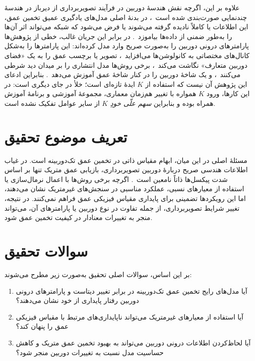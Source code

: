 علاوه بر این، اگرچه نقش هندسهٔ دوربین در فرآیند تصویربرداری از دیرباز در هندسهٔ
چندنمایی صورت‌بندی شده است~\cite{HartleyZisserman2004}، در بدنهٔ اصلی مدل‌های
یادگیری عمیق تخمین عمق، این اطلاعات یا کاملاً نادیده گرفته می‌شوند یا فرض می‌شود
که شبکه می‌تواند اثر آن‌ها را به‌طور ضمنی از داده‌ها بیاموزد~\cite{Eigen2014Depth,Godard2019Digging,Ranftl2021DPT}.
در برابر این جریان غالب، خطی از پژوهش‌ها پارامترهای درونی دوربین را به‌صورت صریح
وارد مدل کرده‌اند:  این پارامترها را به‌شکل کانال‌های مختصاتی به
کانولوشن‌ها می‌افزاید~\cite{Facil2019CAMConvs}،  تصویر یا برچسب عمق
را به یک «فضای دوربین متعارف» نگاشت می‌کند~\cite{Yin2023Metric3D}، برخی روش‌ها مدل
انتشاری را بر میدان دید شرطی می‌کنند~\cite{Saxena2023FOV}، و  یک
شاخهٔ دوربین را در کنار شاخهٔ عمق آموزش می‌دهد~\cite{Piccinelli2024UniDepth}.
بنابراین ادعای این پژوهش آن نیست که استفاده از $K$ ایدهٔ تازه‌ای است؛ خلأ در جای
دیگری است: در این کارها، ورود $K$ همواره با تغییر هم‌زمان معماری، مجموعهٔ آموزشی و
برنامهٔ آموزش همراه بوده و بنابراین \emph{سهم علّی خودِ $K$} از سایر عوامل تفکیک
نشده است.

\section{تعریف موضوع تحقیق}
مسئلهٔ اصلی در این میان، ابهام مقیاس ذاتی در تخمین عمق تک‌دوربینه است.
در غیاب اطلاعات هندسی صریح دربارهٔ دوربین تصویربرداری،
بازیابی عمق متریک تنها بر اساس شدت پیکسل‌ها ذاتاً نامعین است~\cite{HartleyZisserman2004}. اگرچه برخی روش‌ها با اعمال نرمال‌سازی یا استفاده از معیارهای نسبی، عملکرد مناسبی در سنجش‌های غیرمتریک نشان می‌دهند، اما این رویکردها تضمینی برای پایداری مقیاس فیزیکی عمق فراهم نمی‌کنند. در نتیجه، تغییر شرایط تصویربرداری، از جمله تفاوت در نوع دوربین یا پارامترهای آن، می‌تواند منجر به تغییرات معنادار در کیفیت تخمین عمق شود.




\section{سوالات تحقیق}
بر این اساس، سوالات اصلی تحقیق به‌صورت زیر مطرح می‌شوند:
\begin{enumerate}
	\item
	آیا مدل‌های رایج تخمین عمق تک‌دوربینه در برابر تغییر دیتاست و پارامترهای درونی دوربین رفتار پایداری از خود نشان می‌دهند؟
	\item
	آیا استفاده از معیارهای غیرمتریک می‌تواند ناپایداری‌های مرتبط با مقیاس فیزیکی عمق را پنهان کند؟
	\item
	آیا لحاظ‌کردن اطلاعات درونی دوربین می‌تواند به بهبود تخمین عمق متریک و کاهش حساسیت مدل نسبت به تغییرات دوربین منجر شود؟
\end{enumerate}

